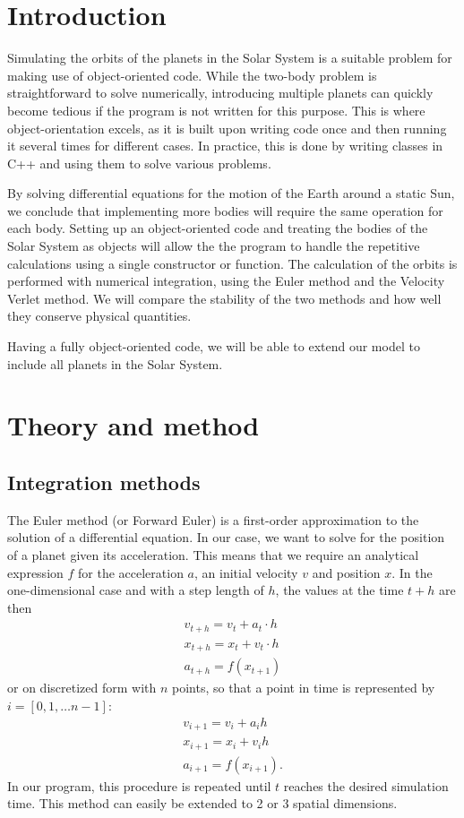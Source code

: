 \documentclass{emulateapj}
\begin{document}
\section{Introduction}
\label{sec:introduction}
Simulating the orbits of the planets in the Solar System is a suitable problem for making use of object-oriented code. While the two-body problem is straightforward to solve numerically, introducing multiple planets can quickly become tedious if the program is not written for this purpose. This is where object-orientation excels, as it is built upon writing code once and then running it several times for different cases. In practice, this is done by writing classes in C++ and using them to solve various problems.

By solving differential equations for the motion of the Earth around a static Sun, we conclude that implementing more bodies will require the same operation for each body. Setting up an object-oriented code and treating the bodies of the Solar System as objects will allow the the program to handle the repetitive calculations using a single constructor or function. The calculation of the orbits is performed with numerical integration, using the Euler method and the Velocity Verlet method. We will compare the stability of the two methods and how well they conserve physical quantities. 

Having a fully object-oriented code, we will be able to extend our model to include all planets in the Solar System.

\section{Theory and method}
\label{sec:method}

\subsection{Integration methods}
The Euler method (or Forward Euler) is a first-order approximation to the solution of a differential equation. In our case, we want to solve for the position of a planet given its acceleration. This means that we require an analytical expression $f$ for the acceleration $a$, an initial velocity $v$ and position $x$. In the one-dimensional case and with a step length of $h$, the values at the time $t + h$ are then
%
\begin{gather*}
    v_{t + h} = v_{t} + a_{t} \cdot h \\
    x_{t + h} = x_{t} + v_{t} \cdot h \\
    a_{t + h} = f(x_{t+1}) 
\end{gather*}
%
or on discretized form with $n$ points, so that a point in time is represented by $ i = \left[0, 1, \dots n-1 \right]$:
%
\begin{gather*}
    v_{i + 1} = v_i + a_i h \\
    x_{i + 1} = x_i + v_i h \\
    a_{i + 1} = f(x_{i+1}).
\end{gather*}
%
In our program, this procedure is repeated until $t$ reaches the desired simulation time. This method can easily be extended to 2 or 3 spatial dimensions.
\end{document}
